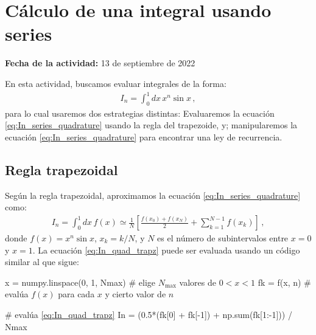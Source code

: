 \documentclass[../portafolio.tex]{subfiles}
\begin{document}


\section{Cálculo de una integral usando series} 

\hfill \textbf{Fecha de la actividad:} 13 de septiembre de 2022

\medskip

En esta actividad, buscamos evaluar integrales de la forma:
\begin{align}
  \label{eq:In_series_quadrature}
  I_n = \int_0^1 dx\, x^n \sin x \,,
\end{align}
%
para lo cual usaremos dos estrategias distintas: Evaluaremos la ecuación \eqref{eq:In_series_quadrature} usando la regla del trapezoide, y; manipularemos la ecuación \eqref{eq:In_series_quadrature} para encontrar una ley de recurrencia.

\subsection{Regla trapezoidal}
Según la regla trapezoidal, aproximamos la ecuación \eqref{eq:In_series_quadrature} como:
\begin{align}
  \label{eq:In_quad_trapz}
  I_n = \int_0^1 dx\,f(x) \simeq \frac{1}{N} \left[ \frac{f(x_0) + f(x_N)}{2} + \sum_{k=1}^{N-1} f(x_k)  \right] \,,
\end{align}
%
donde $f(x)=x^n \sin x$, $x_k=k/N$, y $N$ es el número de subintervalos entre $x=0$ y $x=1$. La ecuación \eqref{eq:In_quad_trapz} puede ser evaluada usando un código similar al que sigue: 
\begin{pythoncode}
  x = numpy.linspace(0, 1, Nmax)   # elige $N_\text{max}$ valores de $0<x<1$
  fk = f(x, n)                  # evalúa $f(x)$ para cada $x$ y cierto valor de $n$
  
  # evalúa \eqref{eq:In_quad_trapz}
  In = (0.5*(fk[0] + fk[-1]) + np.sum(fk[1:-1])) / Nmax
\end{pythoncode}
\end{document}
